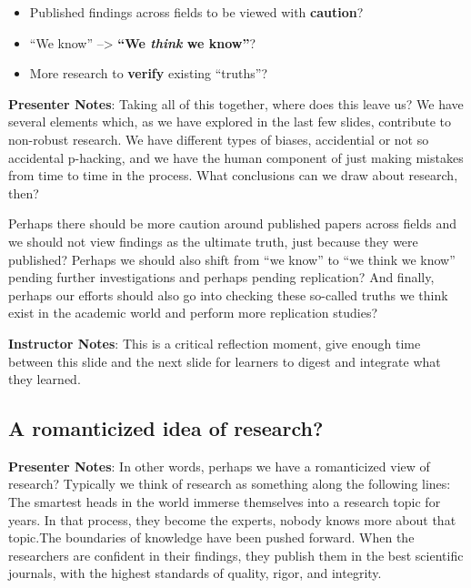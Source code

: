 \documentclass[
  letterpaper,
  DIV=11,
  numbers=noendperiod]{scrartcl}
\providecommand{\tightlist}{%
  \setlength{\itemsep}{0pt}\setlength{\parskip}{0pt}}
\begin{document}
\begin{tcolorbox}[enhanced jigsaw, arc=.35mm, bottomrule=.15mm, bottomtitle=1mm, breakable, colback=white, colbacktitle=quarto-callout-note-color!10!white, colframe=quarto-callout-note-color-frame, coltitle=black, left=2mm, leftrule=.75mm, opacityback=0, opacitybacktitle=0.6, rightrule=.15mm, title=\textcolor{quarto-callout-note-color}{\faInfo}\hspace{0.5em}{Note}, titlerule=0mm, toprule=.15mm, toptitle=1mm]

\begin{itemize}
\tightlist
\item
  Published findings across fields to be viewed with \textbf{caution}?
\item
  ``We know'' --\textgreater{} \textbf{``We \emph{think} we know''}?
\item
  More research to \textbf{verify} existing ``truths''?
\end{itemize}

\end{tcolorbox}

\textbf{Presenter Notes}: Taking all of this together, where does this
leave us? We have several elements which, as we have explored in the
last few slides, contribute to non-robust research. We have different
types of biases, accidential or not so accidental p-hacking, and we have
the human component of just making mistakes from time to time in the
process. What conclusions can we draw about research, then?

Perhaps there should be more caution around published papers across
fields and we should not view findings as the ultimate truth, just
because they were published? Perhaps we should also shift from ``we
know'' to ``we think we know'' pending further investigations and
perhaps pending replication? And finally, perhaps our efforts should
also go into checking these so-called truths we think exist in the
academic world and perform more replication studies?

\textbf{Instructor Notes}: This is a critical reflection moment, give
enough time between this slide and the next slide for learners to digest
and integrate what they learned.

\subsection{A romanticized idea of
research?}\label{a-romanticized-idea-of-research}

\textbf{Presenter Notes}: In other words, perhaps we have a romanticized
view of research? Typically we think of research as something along the
following lines: The smartest heads in the world immerse themselves into
a research topic for years. In that process, they become the experts,
nobody knows more about that topic.The boundaries of knowledge have been
pushed forward. When the researchers are confident in their findings,
they publish them in the best scientific journals, with the highest
standards of quality, rigor, and integrity.
\end{document}
